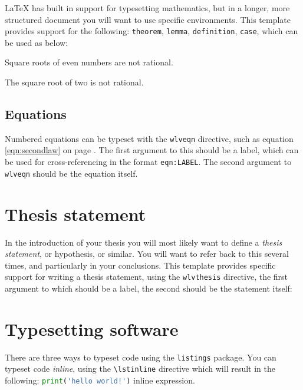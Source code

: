 \LaTeX{} has built in support for typesetting mathematics, but in a
longer, more structured document you will want to use specific
environments. This template provides support for the following:
\verb!theorem!, \verb!lemma!, \verb!definition!, \verb!case!, which
can be used as below:

\begin{theorem}
\label{thm:evens}
Square roots of even numbers are not rational.
\end{theorem}

\begin{lemma}
\label{thm:two}
The square root of two is not rational.
\end{lemma}

\subsection{Equations}

Numbered equations can be typeset with the \verb!wlveqn! directive,
such as equation \ref{eqn:secondlaw} on page
\pageref{eqn:secondlaw}. The first argument to this should be a label,
which can be used for cross-referencing in the format
\verb!eqn:LABEL!. The second argument to \verb!wlveqn! should be the
equation itself.



\section{Thesis statement}


In the introduction of your thesis you will most likely want to define
a \emph{thesis statement}, or hypothesis, or similar. You will want to
refer back to this several times, and particularly in your
conclusions. This template provides specific support for writing a
thesis statement, using the \verb!wlvthesis! directive, the first
argument to which should be a label, the second should be the
statement itself:



\section{Typesetting software}

There are three ways to typeset code using the \verb!listings!
  package. You can typeset code \emph{inline}, using the
  \verb!\lstinline! directive which will result in the following:
  \lstinline[language=Python]$print('hello world!')$ inline
  expression.

